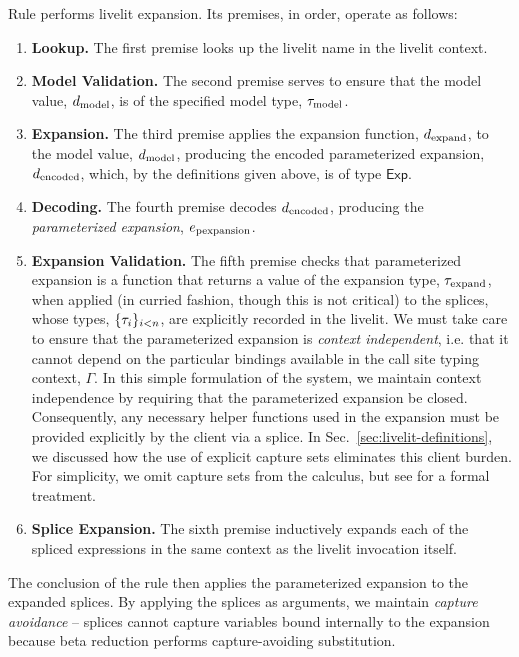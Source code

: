 Rule  performs livelit expansion. Its premises, in order, operate as follows:
\begin{enumerate}[itemsep=3px,leftmargin=*]
    \item \textbf{Lookup.} The first premise looks up the livelit name in the livelit context.
    \item \textbf{Model Validation.} The second premise serves to ensure that the model value, $d_\text{model}$, is of the
    specified model type, $\tau_\text{model}$.
    \item \textbf{Expansion.} The third premise applies the expansion function, $d_\text{expand}$, to the model value, $d_\text{model}$,
    producing the encoded parameterized expansion, $d_\text{encoded}$, which, by the definitions given above, is of type $\mathsf{Exp}$.
    \item \textbf{Decoding.} The fourth premise decodes $d_\text{encoded}$, producing the \emph{parameterized expansion}, $e_\text{pexpansion}$.
    \item \textbf{Expansion Validation.} The fifth premise checks that {parameterized expansion} is a function that returns a value of the expansion type, $\tau_\text{expand}$, when applied (in curried fashion, though this is not critical)
    to the splices, whose types, $\{\tau_i\}_{i < n}$, are explicitly recorded in the livelit.
    We must take care to ensure that the parameterized expansion is \emph{context independent},
    i.e. that it cannot depend on the particular bindings available in the call site typing context, $\Gamma$.
    In this simple formulation of the system, we maintain context independence by
    requiring that the parameterized expansion be
    closed. Consequently, any necessary helper functions used in the expansion must be provided explicitly by the client
    via a splice. 
    In Sec.~\ref{sec:livelit-definitions}, we discussed how the use of explicit capture sets eliminates this client burden.
    For simplicity, we omit capture sets from the calculus, but see \cite{TLMs} for a formal treatment.
    \item \textbf{Splice Expansion.} The sixth premise inductively expands each of the spliced expressions in the same context as the livelit
    invocation itself.
\end{enumerate}
The conclusion of the rule then applies the parameterized expansion to the expanded splices.
By applying the splices as arguments, we maintain \emph{capture avoidance} -- splices cannot capture variables
bound internally to the expansion because beta reduction performs capture-avoiding substitution. 

